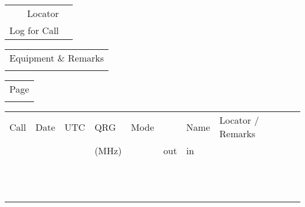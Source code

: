 \documentclass[10pt,a5paper,oneside,landscape]{article}
\begin{document}
\selectfont 

\begin{minipage}[b]{0.25\linewidth}\centering
	\begin{tabular}{rl}
  		Locator& \underline{\hspace{2.5cm}}\\ [2ex]
  		Log for Call& \underline{\hspace{2.5cm}}\\ [2ex]
	\end{tabular}
\end{minipage}
\begin{minipage}[b]{0.6\linewidth}
	\begin{tabular}{l}
  		Equipment \& Remarks\\ [2ex]
  		\underline{\hspace{11.65cm}}\\ [2ex]
	\end{tabular}
\end{minipage}
\begin{minipage}[b]{0.1\linewidth}
	\begin{tabular}{r}
		Page \\ [2ex]
  		\underline{\hspace{1.5cm}}\\ [2ex]
	\end{tabular}	
\end{minipage}

\begin{tabular}{
	| >{\centering\arraybackslash}m{2.5cm} %
	| >{\centering\arraybackslash}m{1.5cm}  %
	| >{\centering\arraybackslash}m{1.5cm}  %
	| >{\centering\arraybackslash}m{1cm}  %
	| >{\centering\arraybackslash}m{.75cm}  %
	| >{\centering\arraybackslash}m{.75cm}  %
	| >{\centering\arraybackslash}m{.75cm}  %
	| >{\centering\arraybackslash}m{1.5cm} %
	| >{\centering\arraybackslash}m{4.75cm} %
	|}
	\hline
	Call &
	Date &
	UTC &
	QRG &
	Mode &
	\multicolumn{2}{c|}{Rapport} &
	Name &
	Locator / Remarks\\ [1ex]
	 
	&  &  & (MHz) & & out & in & & \\ [1ex]
	\hline
	&  & & &  &  & & & \\ [2ex]
	\hline
	&  & & &  &  & & & \\ [2ex]
	\hline
	&  & & &  &  & & & \\ [2ex]
	\hline
	&  & & &  &  & & & \\ [2ex]
	\hline
	&  & & &  &  & & & \\ [2ex]
	\hline
	&  & & &  &  & & & \\ [2ex]
	\hline
	&  & & &  &  & & & \\ [2ex]
	\hline
	&  & & &  &  & & & \\ [2ex]
	\hline
	&  & & &  &  & & & \\ [2ex]
	\hline
	&  & & &  &  & & & \\ [2ex]
	\hline
	&  & & &  &  & & & \\ [2ex]
	\hline
	&  & & &  &  & & & \\ [2ex]
	\hline
\end{tabular}
\pagebreak
\end{document}
